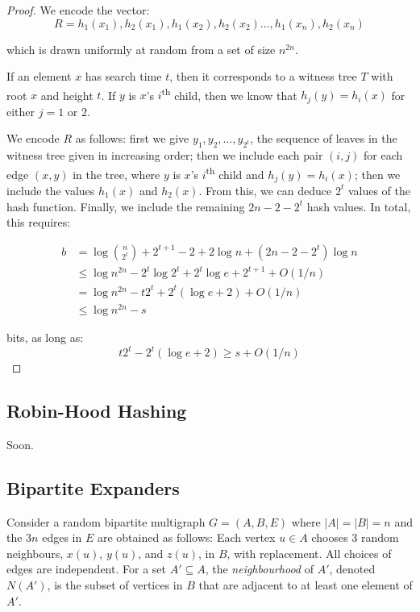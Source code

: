 \documentclass{patmorin}
\begin{document}
\begin{proof}
  We encode the vector:
  \[
  R = h_1(x_1), h_2(x_1), h_1(x_2), h_2(x_2) \ldots, h_1(x_n), h_2(x_n)
  \]

  which is drawn uniformly at random from a set of size $n^{2n}$.

  If an element $x$ has search time $t$, then it corresponds to a
  witness tree $T$ with root $x$ and height $t$. If $y$ is $x$'s
  $i$\textsuperscript{th} child, then we know that $h_j(y) = h_i(x)$
  for either $j = 1$ or $2$.

  We encode $R$ as follows: first we give $y_1, y_2, \ldots, y_{2^t}$,
  the sequence of leaves in the witness tree given in increasing
  order; then we include each pair $(i, j)$ for each edge $(x, y)$ in
  the tree, where $y$ is $x$'s $i$\textsuperscript{th} child and
  $h_j(y) = h_i(x)$; then we include the values $h_1(x)$ and
  $h_2(x)$. From this, we can deduce $2^t$ values of the hash
  function. Finally, we include the remaining $2n - 2 - 2^t$ hash
  values. In total, this requires:

  \begin{align*}
    b & = \log \binom{n}{2^t} + 2^{t + 1} - 2 + 2\log n + (2n - 2 - 2^t)\log n \\
      & \le \log n^{2n} - 2^t \log 2^t + 2^t \log e + 2^{t + 1} + O(1/n) \\
      & = \log n^{2n} - t 2^t + 2^t (\log e + 2) + O(1/n) \\
      & \le \log n^{2n} - s
  \end{align*}

  bits, as long as:
  \[t 2^t - 2^t(\log e + 2) \geq s + O(1/n)\]
\end{proof}

\subsection{Robin-Hood Hashing}

Soon.


\subsection{Bipartite Expanders}

Consider a random bipartite multigraph $G=(A,B,E)$ where $|A|=|B|=n$
and the $3n$ edges in $E$ are obtained as follows:  Each vertex $u\in A$
chooses 3 random neighbours, $x(u)$, $y(u)$, and $z(u)$, in $B$, with
replacement.  All choices of edges are independent. For a set $A'\subseteq
A$, the \emph{neighbourhood} of $A'$, denoted $N(A')$, is the subset of
vertices in $B$ that are adjacent to at least one element of $A'$.
\end{document}
